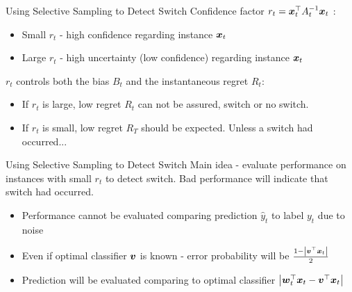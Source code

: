 \documentclass{beamer}
\begin{document}
\begin{frame}{Using Selective Sampling to Detect Switch}
Confidence factor $r_t={{\boldsymbol{x}}}^{\top}_{t}A_{t}^{-1}{\boldsymbol{x}}_{t}$ :\newline
\begin{itemize}
\item Small  $r_t$ - high confidence regarding instance ${\boldsymbol{x}}_{t}$
\item Large  $r_t$ - high uncertainty (low confidence) regarding instance ${\boldsymbol{x}}_{t}$
\newline
\end{itemize}
 $r_t$ controls both the bias $B_t$  and the instantaneous regret $R_t$:\newline
\begin{itemize}
\item If $r_t$ is large, low regret $R_t$ can not be assured, switch or no switch.
\item If $r_t$ is small, low regret $R_T$ should be expected. Unless a switch had occurred...
\end{itemize}

\end{frame}


\begin{frame}{Using Selective Sampling to Detect Switch}
 Main idea - evaluate performance on instances with small $r_t$ to detect switch.\newline\newline
Bad performance will indicate that switch had occurred.\newline
\begin{itemize}
\item Performance cannot be evaluated comparing prediction $\hat{y}_t$ to label $y_t$ due to noise\newline
\item Even if optimal classifier ${\boldsymbol{v}}$ is known - error probability will be  $\frac{1-\left|{{\boldsymbol{v}}}^{\top}{\boldsymbol{x}}_{t}\right|}{2}$\newline
\item Prediction will be evaluated comparing to optimal classifier $\left\vert{{\boldsymbol{w}}}^{\top}_{t}{\boldsymbol{x}}_{t}-{{\boldsymbol{v}}}^{\top}{\boldsymbol{x}}_{t}\right\vert$\newline
\end{itemize}
\end{frame}
\end{document}
